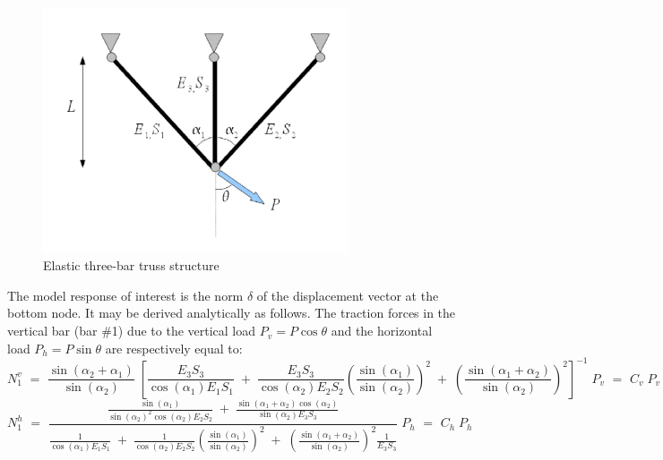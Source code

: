 \documentclass[11pt]{article}
\begin{document}
\begin{figure}[Hhbtp] 
  \begin{center}
    \includegraphics[width=9cm]{Treillis.pdf}
  \end{center} 
  \caption{Elastic three-bar truss structure}
  \label{fig_treillis}
\end{figure}



The model response of interest is the norm $\delta$ of the displacement vector at the bottom node. It may be derived analytically as follows. The traction forces in the vertical bar (bar \#1) due to the vertical load $P_v = P \cos \theta$ and the horizontal load $P_h = P \sin \theta$ are respectively equal to:
\begin{equation}
 N_1^v \, \, = \, \, \frac{\sin(\alpha_2 + \alpha_1)}{\sin(\alpha_2)} \; 
\left[ \frac{E_3 S_3}{\cos(\alpha_1) E_1 S_1} \; + \; \frac{E_3 S_3}{\cos(\alpha_2) E_2 S_2} \left( \frac{\sin(\alpha_1)}{\sin(\alpha_2)}\right)^2 \; + \; 
 \left( \frac{\sin(\alpha_1 + \alpha_2)}{\sin(\alpha_2)}\right)^2 \right]^{-1} 
\; P_v \, \, = \, \, C_v \; P_v
\end{equation}
\begin{equation}
 N_1^h \, \, = \, \, 
\frac{ \frac{\sin(\alpha_1)}{\sin(\alpha_2)^2 \cos(\alpha_2) E_2 S_2}  \; + \; \frac{\sin(\alpha_1 + \alpha_2) \cos(\alpha_2)}{\sin(\alpha_2) E_3 S_3}     }
{ \frac{1}{\cos(\alpha_1) E_1 S_1} \; + \; \frac{1}{\cos(\alpha_2) E_2 S_2} \left( \frac{\sin(\alpha_1)}{\sin(\alpha_2)}\right)^2 \; + \; 
 \left( \frac{\sin(\alpha_1 + \alpha_2)}{\sin(\alpha_2)}\right)^2  \frac{1}{E_3 S_3} }
\; P_h \, \, = \, \, C_h \; P_h
\end{equation}
\end{document}
